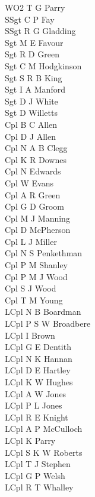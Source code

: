 \begin{multicols}{2}
  \noindent
  WO2 T G Parry \\
  SSgt C P Fay \\
  SSgt R G Gladding \\
  Sgt M E Favour \\
  Sgt R D Green \\
  Sgt C M Hodgkinson \\
  Sgt S R B King \\
  Sgt I A Manford \\
  Sgt D J White \\
  Sgt D Willetts \\
  Cpl B C Allen \\
  Cpl D J Allen \\
  Cpl N A B Clegg \\
  Cpl K R Downes \\
  Cpl N Edwards \\
  Cpl W Evans \\
  Cpl A R Green \\
  Cpl G D Groom \\
  Cpl M J Manning \\
  Cpl D McPherson \\
  Cpl L J Miller \\
  Cpl N S Penkethman \\
  Cpl P M Shanley \\
  Cpl P M J Wood \\
  Cpl S J Wood \\
  Cpl T M Young \\
  LCpl N B Boardman \\
  LCpl P S W Broadbere \\
  LCpl I Brown \\
  LCpl G E Dentith \\
  LCpl N K Hannan \\
  LCpl D E Hartley \\
  LCpl K W Hughes \\
  LCpl A W Jones \\
  LCpl P L Jones \\
  LCpl R E Knight \\
  LCpl A P McCulloch \\
  LCpl K Parry \\
  LCpl S K W Roberts \\
  LCpl T J Stephen \\
  LCpl G P Welsh \\
  LCpl R T Whalley \\

\end{multicols}

